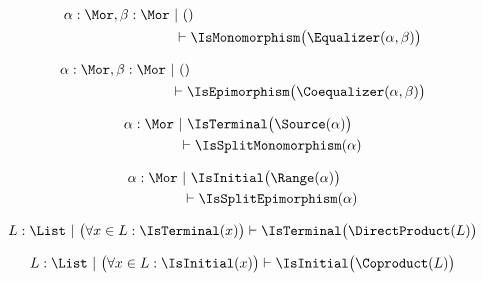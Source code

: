 \begin{sequent}
\begin{align*}
  \alpha:\Mor, \beta:\Mor  ~&|~ () \\
  &\vdash \IsMonomorphism\big( \Equalizer( \alpha, \beta ) \big)
\end{align*}
\end{sequent}

\begin{sequent}
\begin{align*}
  \alpha:\Mor, \beta:\Mor  ~&|~ () \\
  &\vdash \IsEpimorphism\big( \Coequalizer( \alpha, \beta ) \big)
\end{align*}
\end{sequent}

\begin{sequent}\label{sequent:no_proper_context_7}
\begin{align*}
  \alpha:\Mor ~&|~ \IsTerminal\big( \Source( \alpha ) \big)\\
  &\vdash \IsSplitMonomorphism( \alpha )
\end{align*}
\end{sequent}

\begin{sequent}\label{sequent:no_proper_context_8}
\begin{align*}
  \alpha:\Mor ~&|~ \IsInitial\big( \Range( \alpha ) \big)\\
  &\vdash \IsSplitEpimorphism( \alpha )
\end{align*}
\end{sequent}

\begin{sequent}
\begin{align*}
  L: \List ~|~ \big(\forall x \in L: \IsTerminal(x)\big) \vdash \IsTerminal\big( \DirectProduct( L ) \big)
\end{align*}
\end{sequent}

\begin{sequent}
\begin{align*}
  L: \List ~|~ \big(\forall x \in L: \IsInitial(x)\big) \vdash \IsInitial\big( \Coproduct( L ) \big)
\end{align*}
\end{sequent}




